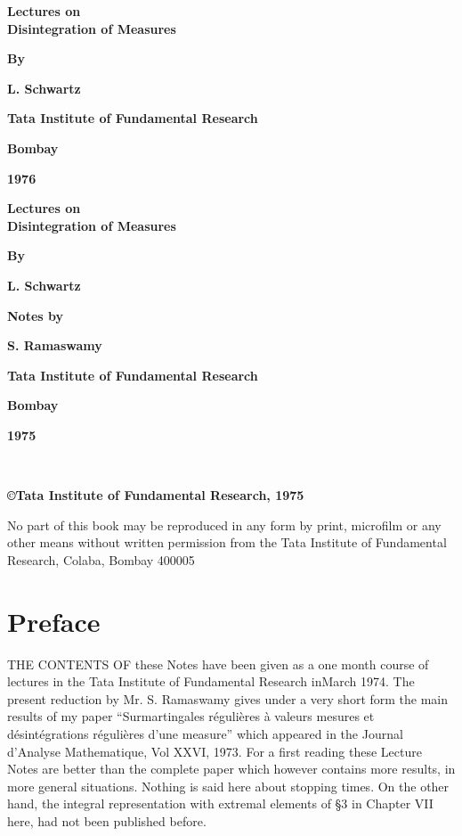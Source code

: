 \thispagestyle{empty}
\begin{center}
{\Large\bf Lectures on}\\[5pt]
{\Large\bf Disintegration of Measures}
\vfill

{\bf By}
\medskip

{\large\bf L. Schwartz}
\vfill

{\bf Tata Institute of Fundamental Research}
\medskip

{\bf Bombay}
\medskip

{\bf 1976}
\end{center}
\eject

\thispagestyle{empty}

\begin{center}
{\Large\bf Lectures on}\\[5pt]
{\Large\bf Disintegration of Measures}
\vfill

{\bf By}
\medskip

{\large\bf L. Schwartz}
\vfill


\vfill

{\bf Notes by}
\medskip

{\large\bf S. Ramaswamy}
\vfill


{\bf Tata Institute of Fundamental Research}
\medskip

{\bf Bombay}
\medskip

\medskip
{\bf 1975}
\end{center}
\eject

\thispagestyle{empty}
\begin{center}
~
\phantom{a}


\vfill

{\bf \copyright \quad Tata Institute of Fundamental Research, 1975}
\vfill

\parbox{0.7\textwidth}{%
No part of this book may be reproduced
in any form by print, microfilm or any
other means without written permission
from the Tata Institute of Fundamental
Research, Colaba, Bombay 400005}

\end{center}
\eject

\chapter{Preface}


THE CONTENTS OF these Notes have been given as a one month course of
lectures in the Tata Institute of Fundamental Research in\break March
1974. The present reduction by Mr. S. Ramaswamy gives under a very
short form the main results of my paper ``Surmartingales
r\'eguli\`eres \`a valeurs mesures et d\'esint\'egrations
r\'eguli\`eres d'une measure'' which appeared in the Journal d'Analyse
Mathematique, Vol XXVI, 1973. For a first reading these Lecture Notes
are better than the complete paper which however contains more
results, in more general situations. Nothing is said here about
stopping times. On the other hand, the integral representation with
extremal elements of \S 3 in Chapter VII here, had not been published
before.
\vskip 1cm

